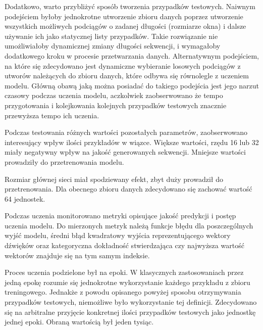 {{        Dodatkowo, warto przybliżyć sposób tworzenia przypadków testowych. Naiwnym podejściem byłoby
        jednokrotne utworzenie zbioru danych poprzez utworzenie wszystkich możliwych podciągów o\,\,zadanej
        długości (rozmiarze okna) i\,\,dalsze używanie ich jako statycznej listy przypadków. 
        Takie rozwiązanie nie umożliwiałoby dynamicznej zmiany długości sekwencji, i\,\,wymagałoby dodatkowego 
        kroku w\,\,procesie przetwarzania danych. Alternatywnym podejściem, na które się zdecydowano jest dynamiczne
        wybieranie losowych podciągów z\,\,utworów należących do zbioru danych, które odbywa się równolegle z\,\,uczeniem modelu. 
        Główną obawą jaką można posiadać do takiego podejścia jest jego narzut czasowy podczas uczenia modelu, 
        aczkolwiek zaobserwowano że tempo przygotowania i\,\,kolejkowania kolejnych przypadków testowych znacznie przewyższa tempo ich uczenia.

        \bigskip

        Podczas testowania różnych wartości pozostałych parametrów, zaobserwowano interesujący wpływ ilości przykładów w\,\,wiązce.
        Większe wartości, rzędu 16 lub 32 miały negatywny wpływ na jakość generowanych sekwencji. 
        Mniejsze wartości prowadziły do przetrenowania modelu.

        Rozmiar głównej sieci miał spodziewany efekt, zbyt duży prowadził do przetrenowania. Dla obecnego
        zbioru danych zdecydowano się zachować wartość 64 jednostek.

        \bigskip

        Podczas uczenia monitorowano metryki opisujące jakość predykcji i\,\,postęp uczenia modelu.
        Do mierzonych metryk należą funkcje błędu dla poszczególnych wyjść modelu, średni błąd kwadratowy
        wyjścia reprezentującego wektory dźwięków oraz kategoryczna dokładność stwierdzająca czy najwyższa wartość
        wektorów znajduje się na tym samym indeksie.
        
        Proces uczenia podzielone był na epoki. W\,\,klasycznych zastosowaniach przez jedną epokę rozumie się jednokrotne
        wykorzystanie każdego przykładu z\,\,zbioru treningowego. Jednakże z\,\,powodu opisanego powyżej sposobu otrzymywania
        przypadków testowych, niemożliwe było wykorzystanie tej definicji. Zdecydowano się na arbitralne przyjęcie konkretnej 
        ilości przypadków testowych jako jednostkę jednej epoki. Obraną wartością był jeden tysiąc.

}}
